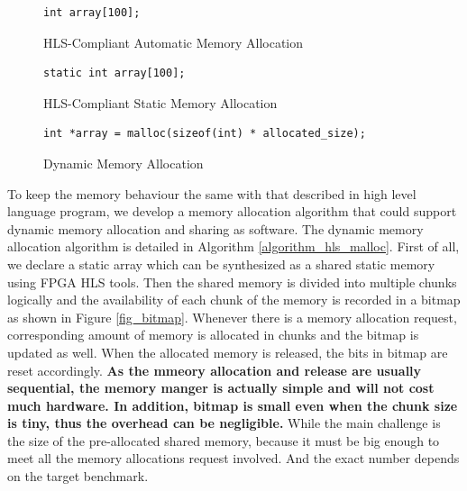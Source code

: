 \documentclass[conference]{IEEEtran}
\begin{document}
\begin{figure}[htb]\centering
{\fontsize{8}{8}\selectfont
\begin{lstlisting}[frame=lines]
int array[100];
\end{lstlisting}
}
\caption{HLS-Compliant Automatic Memory Allocation}\label{Automatic-Memory-Allocation}
\end{figure}

\begin{figure}[htb]\centering
{\fontsize{8}{8}\selectfont
\begin{lstlisting}[frame=lines]
static int array[100];
\end{lstlisting}
}
\caption{HLS-Compliant Static Memory Allocation}\label{Static-Memory-Allocation}
\end{figure}

\begin{figure}[htb]\centering
{\fontsize{8}{8}\selectfont
\begin{lstlisting}[frame=lines]
int *array = malloc(sizeof(int) * allocated_size);
\end{lstlisting}
}
\caption{Dynamic Memory Allocation}\label{Dynamic-Memory-Allocation}
\end{figure}

To keep the memory behaviour the same with that described in high level language program, we develop a memory allocation algorithm that could support dynamic memory allocation and sharing as software. The dynamic memory allocation algorithm is detailed in Algorithm \ref{algorithm_hls_malloc}. First of all, we declare a static array which can be synthesized as a shared static memory using FPGA HLS tools. Then the shared memory is divided into multiple chunks logically and the availability of each chunk of the memory is recorded in a bitmap as shown in Figure \ref{fig_bitmap}. Whenever there is a memory allocation request, corresponding amount of memory is allocated in chunks and the bitmap is updated as well. When the allocated memory is released, the bits in bitmap are reset accordingly. \textbf{As the mmeory allocation and release are usually sequential, the memory manger is actually simple and will not cost much hardware. In addition, bitmap is small even when the chunk size is tiny, thus the overhead can be negligible.} While the main challenge is the size of the pre-allocated shared memory, because it must be big enough to meet all the memory allocations request involved. And the exact number depends on the target benchmark. 
\end{document}
